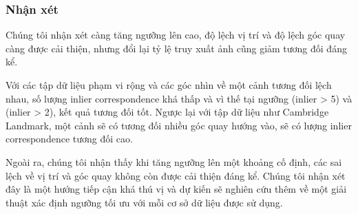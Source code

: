 \subsubsection*{Nhận xét}
Chúng tôi nhận xét càng tăng ngưỡng lên cao, độ lệch vị trí và độ lệch góc quay càng được cải thiện, nhưng đổi lại tỷ lệ truy xuất ảnh cũng giảm tương đối đáng kể. 

Với các tập dữ liệu phạm vi rộng và các góc nhìn về một cảnh tương đối lệch nhau, số lượng inlier correspondence khá thấp và vì thế tại ngưỡng (inlier > 5) và (inlier > 2), kết quả tương đối tốt. Ngược lại với tập dữ liệu như Cambridge Landmark, một cảnh sẽ có tương đối nhiều góc quay hướng vào, sẽ có lượng inlier correspondence tương đối cao. 

Ngoài ra, chúng tôi nhận thấy khi tăng ngưỡng lên một khoảng cố định, các sai lệch về vị trí và góc quay không còn được cải thiện đáng kể. Chúng tôi nhận xét đây là một hướng tiếp cận khá thú vị và dự kiến sẽ nghiên cứu thêm về một giải thuật xác định ngưỡng tối ưu với mỗi cơ sở dữ liệu được sử dụng.


